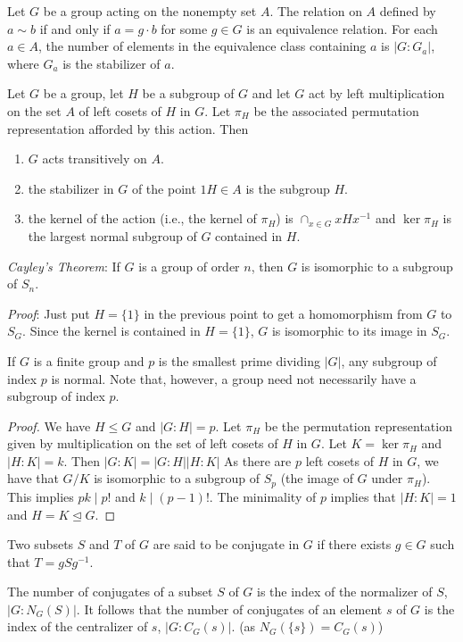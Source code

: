 \documentclass{article}
\numberwithin{equation}{section}
\theoremstyle{definition}
\numberwithin{definition}{section}
\numberwithin{theorem}{section}
\theoremstyle{remark}
\numberwithin{exercise}{section}
\begin{document}
    Let $G$ be a group acting on the nonempty set $A$. The relation on $A$ defined by $a\sim b$ if and only if $a=g\cdot b$ for some $g\in G$ is an equivalence relation. For each $a\in A$, the number of elements in the equivalence class containing $a$ is $|G:G_a|$, where $G_a$ is the stabilizer of $a$.
    
    Let $G$ be a group, let $H$ be a subgroup of $G$ and let $G$ act by left multiplication on the set $A$ of left cosets of $H$ in $G$. Let $\pi_H$ be the associated permutation representation afforded by this action. Then
    \begin{enumerate}[i]
        \item $G$ acts transitively on $A$.
        \item the stabilizer in $G$ of the point $1H\in A$ is the subgroup $H$.
        \item the kernel of the action (i.e., the kernel of $\pi_H$) is $\cap_{x\in G}xHx^{-1}$ and $\ker\pi_H$ is the largest normal subgroup of $G$ contained in $H$.
    \end{enumerate}
    
    \textit{Cayley's Theorem}: If $G$ is a group of order $n$, then $G$ is isomorphic to a subgroup of $S_n$.
    
    \textit{Proof}: Just put $H=\{1\}$ in the previous point to get a homomorphism from $G$ to $S_G$. Since the kernel is contained in $H=\{1\}$, $G$ is isomorphic to its image in $S_G$.
    
    If $G$ is a finite group and $p$ is the smallest prime dividing $|G|$,  any subgroup of index $p$ is normal. Note that, however, a group need not necessarily have a subgroup of index $p$.
    
    \begin{proof}
    We have $H\leq G$ and $|G:H|=p$. Let $\pi_H$ be the permutation representation given by multiplication on the set of left cosets of $H$ in $G$. Let $K=\ker \pi_H$ and $|H:K|=k$. Then $|G:K|=|G:H||H:K|$ As there are $p$ left cosets of $H$ in $G$, we have that $G/K$ is isomorphic to a subgroup of $S_p$ (the image of $G$ under $\pi_H$). This implies $pk\mid p!$ and $k\mid (p-1)!$. The minimality of $p$ implies that $|H:K|=1$ and $H=K\unlhd G$.
    \end{proof}
    
    Two subsets $S$ and $T$ of $G$ are said to be conjugate in $G$ if there exists $g\in G$ such that $T=gSg^{-1}$.
    
    The number of conjugates of a subset $S$ of $G$ is the index of the normalizer of $S$, $|G:N_G(S)|$. It follows that the number of conjugates of an element $s$ of $G$ is the index of the centralizer of $s$, $|G:C_G(s)|$. (as $N_G(\{s\})=C_G(s)$)
    
\end{document}
